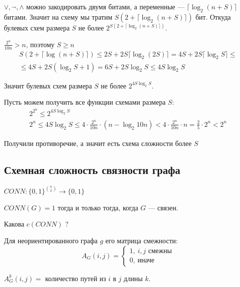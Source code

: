 \( \lor, \lnot, \land \) можно закодировать двумя битами,
а переменные --- \( \lceil \log_2 (n + S) \rceil \) битами.
Значит на схему мы тратим \( S(2 + \lceil \log_2 (n + S) \rceil) \) бит.
Откуда булевых схем размера \( S \) не более \( 2^{S(2 + \lceil \log_2 (n + S) \rceil)} \).

\(
    \displaystyle \frac{2^n}{10n} > n
\),
поэтому \( S \geq n \)
\begin{gather*}
    S(2 + \lceil \log (n + S) \rceil)
    \leq
    2S + 2S \lceil \log_2 (2S) \rceil
    =
    4S + 2S \lceil \log_2 S \rceil
    \leq
    \\
    \leq
    4S + 2S (\log_2 S + 1)
    =
    6S + 2S \log_2 S
    \leq
    4 S \log_2 S
\end{gather*}

Значит булевых схем размера \( S \) не более \( 2^{4 S \log_2 S} \).

Пусть можем получить все функции схемами размера \( S \):
\begin{gather*}
    2^{2^n} \leq 2^{4 S \log_2 S}
    \\
    2^n \leq 4 S \log_2 S \leq 4 \cdot \frac{2^n}{10 n} \cdot ( n - \log_2 10n )
        <
        4 \cdot \frac{2^n}{10 n} \cdot n
        = 
        \frac{2}{5} \cdot 2^n
        < 2^n
\end{gather*}

Получили противоречие, а значит есть схема сложности более \( S \)

\subsection{Схемная сложность связности графа}

\( CONN : \{ 0, 1 \}^{\binom{n}{2}} \to \{ 0, 1 \} \)

\( CONN(G) = 1 \) тогда и только тогда, когда \( G \) --- связен.

Какова \( c(CONN) \) ?

\begin{defn}{}{}
    Для неориентированного графа \( g \) его матрица смежности:
    \[
        A_G (i, j) = \begin{cases}
            1, \ \text{\(i, j\) смежны}
            \\
            0, \ \text{иначе}
        \end{cases}
    \]
\end{defn}

\begin{lemma}{}{}
    \( A_G^k (i, j) = \) количество путей из \( i \) в \( j \) длины \( k \).
\end{lemma}

